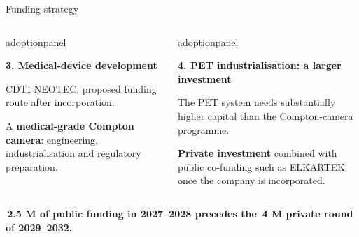 \documentclass[aspectratio=169,11pt]{beamer}
\begin{document}
\begin{frame}{Funding strategy}
\begin{columns}[T,onlytextwidth]
\begin{beamercolorbox}[sep=6pt,wd=\linewidth]{adoptionpanel}
\begin{minipage}[t][2.0cm][t]{\linewidth}
{\footnotesize\bfseries\color{crBlue}3. Medical-device development\par}
\vspace{0.07cm}
{\scriptsize CDTI NEOTEC, proposed funding route after incorporation.\par\vspace{0.06cm}
A \textbf{medical-grade Compton camera}: engineering, industrialisation and regulatory preparation.\par}
\end{minipage}
\end{beamercolorbox}
\begin{beamercolorbox}[sep=6pt,wd=\linewidth]{adoptionpanel}
\begin{minipage}[t][2.0cm][t]{\linewidth}\raggedright
{\footnotesize\bfseries\color{crBlue}4. PET industrialisation: a larger investment\par}
\vspace{0.07cm}
{\scriptsize The PET system needs substantially higher capital than the Compton-camera programme.\par\vspace{0.06cm}
\textbf{Private investment} combined with public co-funding such as ELKARTEK once the company is incorporated.\par}
\end{minipage}
\end{beamercolorbox}
\end{columns}
\vspace{0.14cm}
{\footnotesize\bfseries\color{darkred}\EUR\,2.5 M of public funding in 2027--2028 precedes the \EUR\,4 M private round of 2029--2032.\par}
\end{frame}


\end{document}
